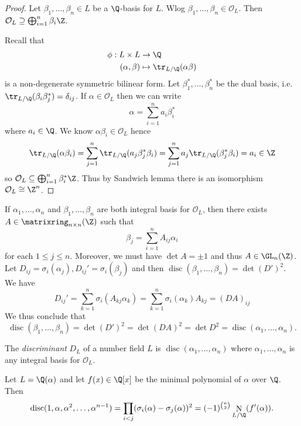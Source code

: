 \documentclass[a4paper]{article}
\renewcommand*{\O}{\mathcal{O}}
\DeclareMathOperator{\n}{N}
\DeclareMathOperator{\disc}{disc}
\begin{document}
\begin{proof}
  Let \(\beta_1, \dots, \beta_n \in L\) be a \(\Q\)-basis for \(L\). Wlog \(\beta_1, \dots, \beta_n \in \O_L\). Then \(\O_L \supseteq \bigoplus_{i = 1}^n \beta_i\Z\).

  Recall that
  \begin{align*}
    \phi: L \times L &\to \Q \\
    (\alpha, \beta) &\mapsto \tr_{L/\Q}(\alpha\beta)
  \end{align*}
  is a non-degenerate symmetric bilinear form. Let \(\beta_1^*, \dots, \beta_n^*\) be the dual basis, i.e.\ \(\tr_{L/\Q}(\beta_i \beta_j^*) = \delta_{ij}\). If \(\alpha \in \O_L\) then we can write
  \[
    \alpha = \sum_{i = 1}^n a_i\beta_i^*
  \]
  where \(a_i \in \Q\). We know \(\alpha\beta_i \in \O_L\) hence
  \[
    \tr_{L/\Q}(\alpha\beta_i)
    = \sum_{j = 1}^n \tr_{L/\Q}(a_j\beta_j^*\beta_i)
    = \sum_{j = 1}^n a_j \tr_{L/\Q} (\beta_j^*\beta_i)
    = a_i
    \in \Z
  \]
  so \(\O_L \subseteq \bigoplus_{i = 1}^n \beta_i^*\Z\). Thus by Sandwich lemma there is an isomorphism \(\O_L \cong \Z^n\).
\end{proof}

If \(\alpha_1, \dots, \alpha_n\) and \(\beta_1, \dots, \beta_n\) are both integral basis for \(\O_L\), then there exists \(A \in \matrixring_{n \times n}(\Z)\) such that
\[
  \beta_j = \sum_{i = 1}^n A_{ij}\alpha_i
\]
for each \(1 \leq j \leq n\). Moreover, we must have \(\det A = \pm 1\) and thus \(A \in \GL_n(\Z)\). Let \(D_{ij} = \sigma_i(\alpha_j), D_{ij}' = \sigma_i(\beta_j)\) and then \(\disc(\beta_1, \dots, \beta_n) = \det (D')^2\). We have
\[
  D_{ij}'
  = \sum_{k = 1}^n \sigma_i(A_{kj}\alpha_k)
  = \sum_{k = 1}^n \sigma_i(\alpha_k) A_{kj}
  = (DA)_{ij}
\]
We thus conclude that
\[
  \disc(\beta_1, \dots, \beta_n)
  = \det (D')^2
  = \det (DA)^2
  = \det D^2
  = \disc(\alpha_1, \dots, \alpha_n).
\]

\begin{definition}[Discriminant]
  The \emph{discriminant} \(D_L\) of a number field \(L\) is \(\disc(\alpha_1, \dots, \alpha_n)\) where \(\alpha_1, \dots, \alpha_n\) is any integral basis for \(\O_L\).
\end{definition}

\begin{proposition}
  Let \(L = \Q(\alpha)\) and let \(f(x) \in \Q[x]\) be the minimal polynomial of \(\alpha\) over \(\Q\). Then
  \[
    \disc(1, \alpha, \alpha^2, \dots, \alpha^{n - 1})
    = \prod_{i < j} (\sigma_i(\alpha) - \sigma_j(\alpha))^2
    = (-1)^{\binom{n}{2}} \n_{L/\Q}(f'(\alpha)).
  \]
\end{proposition}
\end{document}
